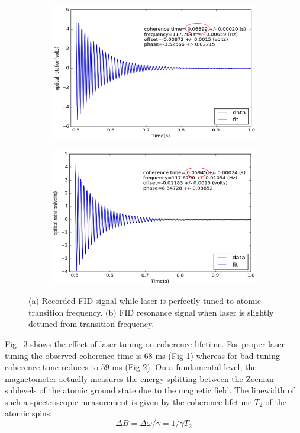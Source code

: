 \begin{itemize}
\begin{figure}
    \begin{subfigure}[b]{0.45\textwidth}
        \centering
        \includegraphics[width=\textwidth]{figures/perfect_tuning}
        \caption{}
        \label{fig:good tuning}
    \end{subfigure}
    \hfill
    \begin{subfigure}[b]{0.45\textwidth}
        \centering
        \includegraphics[width=\textwidth]{figures/bad_tuning}
        \caption{}
        \label{fig:bad tuning}
    \end{subfigure}
    \caption{(a) Recorded FID signal while laser is perfectly tuned to atomic transition frequency. (b) FID resonance signal when laser is slightly detuned from transition frequency.}
    \label{fig:effect of tuning}
\end{figure}
	
	Fig~ \ref{fig:effect of tuning} shows the effect of laser tuning on coherence lifetime. For proper laser tuning the observed coherence time is 68 ms (Fig \ref{fig:good tuning}) whereas for bad tuning coherence time reduces to 59 ms (Fig \ref{fig:bad tuning}). On a fundamental level, the magnetometer actually measures the energy splitting between the Zeeman sublevels of the atomic ground state due to the magnetic field. The linewidth of such a spectroscopic measurement is given by the coherence lifetime $T_2$ of the atomic spins:
\begin{equation}
 ΔB = \Delta\omega/\gamma  = 1/γ T_2
\end{equation}


\end{itemize}
